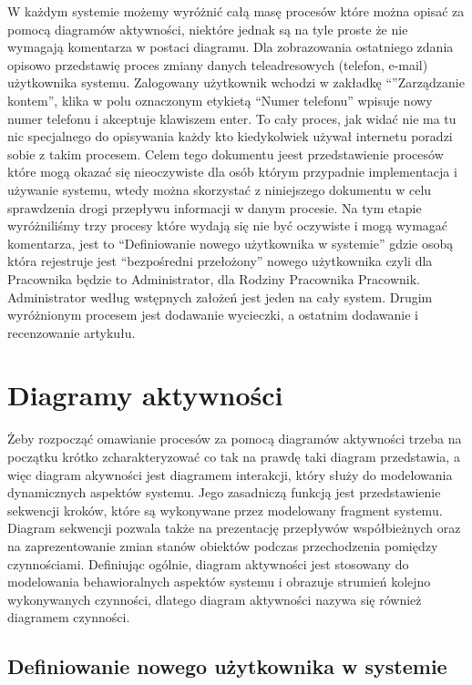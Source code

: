 W każdym systemie możemy wyróżnić całą masę procesów które można opisać za pomocą diagramów aktywności, niektóre jednak są na tyle proste że nie wymagają komentarza w postaci diagramu. Dla zobrazowania ostatniego zdania opisowo przedstawię proces zmiany danych teleadresowych (telefon, e-mail)  użytkownika systemu. Zalogowany użytkownik wchodzi w zakładkę ``''Zarządzanie kontem'', klika w polu oznaczonym etykietą ``Numer telefonu'' wpisuje nowy numer telefonu i akceptuje klawiszem enter. To cały proces, jak widać nie ma tu nic specjalnego do opisywania każdy kto kiedykolwiek używał internetu poradzi sobie z takim procesem. Celem tego dokumentu jeest przedstawienie procesów które mogą okazać się nieoczywiste dla osób którym przypadnie implementacja i używanie systemu, wtedy można skorzystać z niniejszego dokumentu w celu sprawdzenia drogi przepływu informacji w danym procesie. Na tym etapie wyróżniliśmy trzy procesy które wydają się nie być oczywiste i mogą wymagać komentarza, jest to ``Definiowanie nowego użytkownika w systemie'' gdzie osobą która rejestruje jest ``bezpośredni przełożony'' nowego użytkownika czyli dla Pracownika będzie to Administrator, dla Rodziny Pracownika Pracownik. Administrator według wstępnych założeń jest jeden na cały system. Drugim wyróżnionym procesem jest dodawanie wycieczki, a ostatnim dodawanie i recenzowanie artykułu.

\section{Diagramy aktywności}

Żeby rozpocząć omawianie procesów za pomocą diagramów aktywności trzeba na początku krótko zcharakteryzować co tak na prawdę taki diagram przedstawia, a więc diagram akywności jest diagramem interakcji, który służy do modelowania dynamicznych aspektów systemu. Jego zasadniczą funkcją jest przedstawienie sekwencji kroków, które są wykonywane przez modelowany fragment systemu. Diagram sekwencji pozwala także na prezentację przepływów współbieżnych oraz na zaprezentowanie zmian stanów obiektów podczas przechodzenia pomiędzy czynnościami.  Definiując ogólnie, diagram aktywności jest stosowany do modelowania behawioralnych aspektów systemu i obrazuje strumień kolejno wykonywanych czynności, dlatego diagram aktywności nazywa się również diagramem czynności.

\subsection{Definiowanie nowego użytkownika w systemie}

